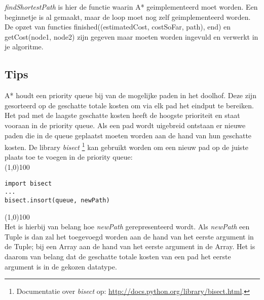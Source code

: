 \documentclass[a4paper]{article}
\begin{document}
\textit{findShortestPath} is hier de functie waarin A* geimplementeerd moet worden. Een beginnetje is al gemaakt, maar de loop moet nog zelf geimplementeerd worden. De opzet van functies finished((estimatedCost, costSoFar, path), end) en getCost(node1,
node2) zijn gegeven maar moeten worden ingevuld en verwerkt in je algoritme.

\subsection{Tips}
A* houdt een priority queue bij van de mogelijke paden in het doolhof. Deze zijn gesorteerd op de geschatte totale kosten om via elk pad het eindput te bereiken. Het pad met de laagste geschatte kosten heeft de hoogste prioriteit en staat vooraan in de priority queue. Als een pad wordt uigebreid ontstaan er nieuwe paden die in de queue geplaatst moeten worden aan de hand van hun geschatte kosten. De library \textit{bisect} \footnote{Documentatie over \textit{bisect} op: \url{http://docs.python.org/library/bisect.html}.} kan gebruikt worden om een nieuw pad op de juiste plaats toe te voegen in de priority queue:\\
\noindent \line(1,0){100}
\begin{verbatim}
import bisect
...
bisect.insort(queue, newPath)
\end{verbatim}
\noindent \line(1,0){100}\\
Het is hierbij van belang hoe \textit{newPath} gerepresenteerd wordt. Als \textit{newPath} een Tuple is dan zal het toegevoegd worden aan de hand van het eerste argument in de Tuple; bij een Array aan de hand van het eerste argument in de Array. Het is daarom van belang dat de geschatte totale kosten van een pad het eerste argument is in de gekozen datatype. 
\end{document}
